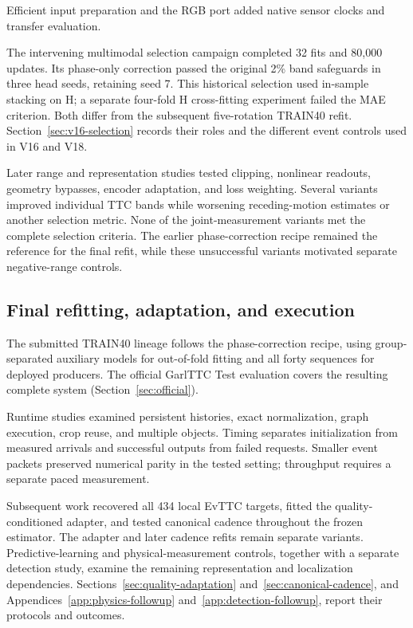 Efficient input preparation and the RGB port added native sensor clocks and transfer evaluation.

The intervening multimodal selection campaign completed 32 fits and 80,000 updates. Its phase-only correction passed the original 2\% band safeguards in three head seeds, retaining seed 7. This historical selection used in-sample stacking on H; a separate four-fold H cross-fitting experiment failed the MAE criterion. Both differ from the subsequent five-rotation TRAIN40 refit. Section~\ref{sec:v16-selection} records their roles and the different event controls used in V16 and V18. 

Later range and representation studies tested clipping, nonlinear readouts, geometry bypasses, encoder adaptation, and loss weighting. Several variants improved individual TTC bands while worsening receding-motion estimates or another selection metric. None of the joint-measurement variants met the complete selection criteria. The earlier phase-correction recipe remained the reference for the final refit, while these unsuccessful variants motivated separate negative-range controls. 

\subsection{Final refitting, adaptation, and execution}
The submitted TRAIN40 lineage follows the phase-correction recipe, using group-separated auxiliary models for out-of-fold fitting and all forty sequences for deployed producers. The official GarlTTC Test evaluation covers the resulting complete system (Section~\ref{sec:official}).

Runtime studies examined persistent histories, exact normalization, graph execution, crop reuse, and multiple objects. Timing separates initialization from measured arrivals and successful outputs from failed requests. Smaller event packets preserved numerical parity in the tested setting; throughput requires a separate paced measurement.

Subsequent work recovered all 434 local EvTTC targets, fitted the quality-conditioned adapter, and tested canonical cadence throughout the frozen estimator. The adapter and later cadence refits remain separate variants. Predictive-learning and physical-measurement controls, together with a separate detection study, examine the remaining representation and localization dependencies. Sections~\ref{sec:quality-adaptation} and~\ref{sec:canonical-cadence}, and Appendices~\ref{app:physics-followup} and~\ref{app:detection-followup}, report their protocols and outcomes.
